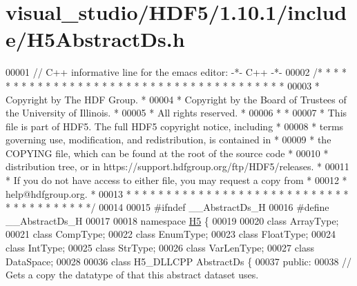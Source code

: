\hypertarget{visual__studio_2_h_d_f5_21_810_81_2include_2_h5_abstract_ds_8h_source}{}\section{visual\+\_\+studio/\+H\+D\+F5/1.10.1/include/\+H5\+Abstract\+Ds.h}
\label{visual__studio_2_h_d_f5_21_810_81_2include_2_h5_abstract_ds_8h_source}

\begin{DoxyCode}
00001 \textcolor{comment}{// C++ informative line for the emacs editor: -*- C++ -*-}
00002 \textcolor{comment}{/* * * * * * * * * * * * * * * * * * * * * * * * * * * * * * * * * * * * * * *}
00003 \textcolor{comment}{ * Copyright by The HDF Group.                                               *}
00004 \textcolor{comment}{ * Copyright by the Board of Trustees of the University of Illinois.         *}
00005 \textcolor{comment}{ * All rights reserved.                                                      *}
00006 \textcolor{comment}{ *                                                                           *}
00007 \textcolor{comment}{ * This file is part of HDF5.  The full HDF5 copyright notice, including     *}
00008 \textcolor{comment}{ * terms governing use, modification, and redistribution, is contained in    *}
00009 \textcolor{comment}{ * the COPYING file, which can be found at the root of the source code       *}
00010 \textcolor{comment}{ * distribution tree, or in https://support.hdfgroup.org/ftp/HDF5/releases.  *}
00011 \textcolor{comment}{ * If you do not have access to either file, you may request a copy from     *}
00012 \textcolor{comment}{ * help@hdfgroup.org.                                                        *}
00013 \textcolor{comment}{ * * * * * * * * * * * * * * * * * * * * * * * * * * * * * * * * * * * * * * */}
00014 
00015 \textcolor{preprocessor}{#ifndef \_\_AbstractDs\_H}
00016 \textcolor{preprocessor}{#define \_\_AbstractDs\_H}
00017 
00018 \textcolor{keyword}{namespace }\hyperlink{namespace_h5}{H5} \{
00019 
00020 \textcolor{keyword}{class }ArrayType;
00021 \textcolor{keyword}{class }CompType;
00022 \textcolor{keyword}{class }EnumType;
00023 \textcolor{keyword}{class }FloatType;
00024 \textcolor{keyword}{class }IntType;
00025 \textcolor{keyword}{class }StrType;
00026 \textcolor{keyword}{class }VarLenType;
00027 \textcolor{keyword}{class }DataSpace;
00028 
00036 \textcolor{keyword}{class }H5\_DLLCPP AbstractDs \{
00037    \textcolor{keyword}{public}:
00038         \textcolor{comment}{// Gets a copy the datatype of that this abstract dataset uses.}

\end{DoxyCode}
